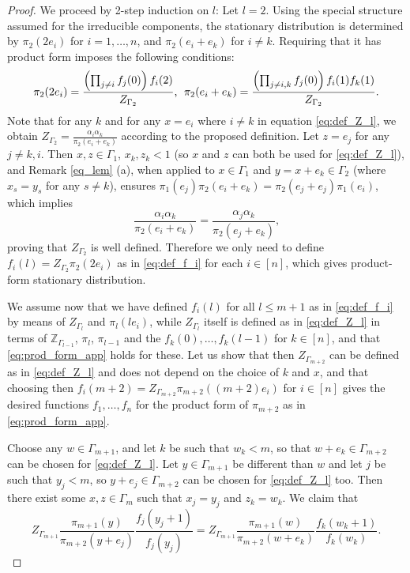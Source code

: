 \documentclass{amsart}
\theoremstyle{definition}
\theoremstyle{remark}
\theoremstyle{Conjecture/open problem}
\theoremstyle{assumption}
\theoremstyle{conjecture}
\def\Z{\mathbb{Z}}
\numberwithin{equation}{section}
\begin{document}
\begin{proof}
We proceed by 2-step induction on $l$: Let $l=2$. Using the special structure assumed for the irreducible components, the stationary distribution is determined by $\pi _2(2e_i)$ for $i=1,\dots ,n$, and $\pi _2(e_i+e_k)$ for $i\neq k$. Requiring that it has product form imposes the following conditions: 
$$\pi _2(2e_i)=\frac{\left( \prod _{j\neq i}f_j(0)\right) f_i(2)}{Z_{\Gamma _2}}\mbox{,\; }\pi _2(e_i+e_k)=\frac{\left( \prod _{j\neq i,k}f_j(0)\right) f_i(1)f_k(1)}{Z_{\Gamma _2}}\mbox{.}$$
Note that for any $k$ and for any $x=e_i$ where $i\neq k$ in equation \eqref{eq:def_Z_l}, we obtain $Z_{\Gamma _2}=\frac{\alpha _i\alpha _k}{\pi _2(e_i+e_k)}$ according to the proposed definition. Let $z=e_j$ for any $j\neq k,i$. Then $x,z\in \Gamma _1$, $x_k,z_k<1$ (so $x$ and $z$ can both be used for \eqref{eq:def_Z_l}), and Remark \ref{eq_lem} (a), when applied to $x\in \Gamma_1$ and $y=x+e_k\in \Gamma _2$ (where $x_s=y_s$ for any $s\neq k$), ensures $\pi _1(e_j)\pi _2(e_i+e_k)=\pi _2(e_j+e_j)\pi _1(e_i)$, which implies
$$\frac{\alpha _i\alpha _k}{\pi _2(e_i+e_k)}=\frac{\alpha _j\alpha _k}{\pi _2(e_j+e_k)}\mbox{,}$$
proving that $Z_{\Gamma _2}$ is well defined. Therefore we only need to define $f_i(l)=Z_{\Gamma _2}\pi _2(2e_i)$ as in \eqref{eq:def_f_i} for each $i\in [n]$, which gives product-form stationary distribution.

We assume now that we have defined $f_i(l)$ for all $l\leq m+1$ as in \eqref{eq:def_f_i} by means of $Z_{\Gamma _l}$ and $\pi _l(le_i)$, while $Z_{\Gamma _l}$ itself is defined as in \eqref{eq:def_Z_l} in terms of $\Z_{\Gamma _{l-1}}$, $\pi _l$, $\pi _{l-1}$ and the $f_k(0),\ldots ,f_k(l-1)$ for $k\in [n]$, and that \eqref{eq:prod_form_app} holds for these. Let us show that then $Z_{\Gamma _{m+2}}$ can be defined as in \eqref{eq:def_Z_l} and does not depend on the choice of $k$ and $x$, and that choosing then $f_i(m+2)=Z_{\Gamma _{m+2}}\pi _{m+2}((m+2)e_i)$ for $i\in [n]$ gives the desired functions $f_1,\ldots ,f_n$ for the product form of $\pi _{m+2}$ as in \eqref{eq:prod_form_app}.

Choose any $w\in \Gamma _{m+1}$, and let $k$ be such that $w_k<m$, so that $w+e_k\in \Gamma _{m+2}$ can be chosen for \eqref{eq:def_Z_l}. Let $y\in \Gamma _{m+1}$ be different than $w$ and let $j$ be such that $y_j<m$, so $y+e_j\in \Gamma _{m+2}$ can be chosen for \eqref{eq:def_Z_l} too. Then there exist some $x,z\in \Gamma _m$ such that $x_j=y_j$ and $z_k=w_k$. We claim that
\begin{equation}\label{eq:claim}Z_{\Gamma _{m+1}}\frac{\pi _{m+1}(y)}{\pi _{m+2}(y+e_j)}\frac{f_j(y_j+1)}{f_j(y_j)}=Z_{\Gamma _{m+1}}\frac{\pi _{m+1}(w)}{\pi _{m+2}(w+e_k)}\frac{f_k(w_k+1)}{f_k(w_k)}\mbox{.}\end{equation} 


\end{proof}
\end{document}
